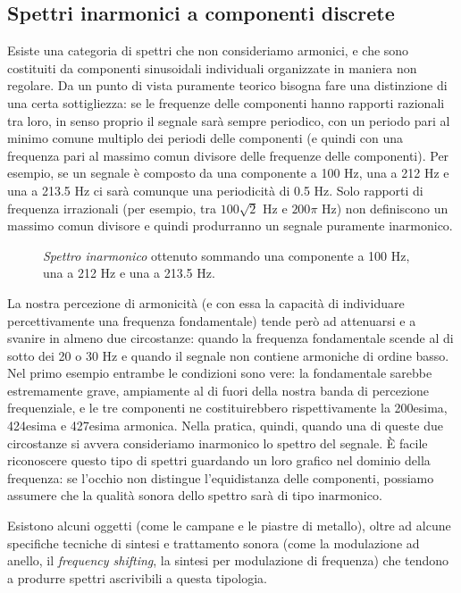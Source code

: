 \subsection{Spettri inarmonici a componenti discrete}

Esiste una categoria di spettri che non consideriamo armonici, e che sono costituiti da componenti sinusoidali individuali organizzate in maniera non regolare. Da un punto di vista puramente teorico bisogna fare una distinzione di una certa sottigliezza: se le frequenze delle componenti hanno rapporti razionali tra loro, in senso proprio il segnale sarà sempre periodico, con un periodo pari al minimo comune multiplo dei periodi delle componenti (e quindi con una frequenza pari al massimo comun divisore delle frequenze delle componenti). Per esempio, se un segnale è composto da una componente a 100 Hz, una a 212 Hz e una a 213.5 Hz ci sarà comunque una periodicità di 0.5 Hz. Solo rapporti di frequenza irrazionali (per esempio, tra $100 \sqrt{2}$ Hz e $200 \pi$ Hz) non definiscono un massimo comun divisore e quindi produrranno un segnale puramente inarmonico.

\begin{figure}
    \begin{center}
       \scalebox{0.6} {}
    \end{center}
    \caption{\emph{Spettro inarmonico} ottenuto sommando una componente a 100 Hz, una a 212 Hz e una a 213.5 Hz.}
\end{figure}


La nostra percezione di armonicità (e con essa la capacità di individuare percettivamente una frequenza fondamentale) tende però ad attenuarsi e a svanire in almeno due circostanze: quando la frequenza fondamentale scende al di sotto dei 20 o 30 Hz e quando il segnale non contiene armoniche di ordine basso. Nel primo esempio entrambe le condizioni sono vere: la fondamentale sarebbe estremamente grave, ampiamente al di fuori della nostra banda di percezione frequenziale, e le tre componenti ne costituirebbero rispettivamente la 200esima, 424esima e 427esima armonica. Nella pratica, quindi, quando una di queste due circostanze si avvera consideriamo inarmonico lo spettro del segnale. È facile riconoscere questo tipo di spettri guardando un loro grafico nel dominio della frequenza: se l'occhio non distingue l'equidistanza delle componenti, possiamo assumere che la qualità sonora dello spettro sarà di tipo inarmonico.

Esistono alcuni oggetti (come le campane e le piastre di metallo), oltre ad alcune specifiche tecniche di sintesi e trattamento sonora (come la modulazione ad anello, il \emph{frequency shifting}, la sintesi per modulazione di frequenza) che tendono a produrre spettri ascrivibili a questa tipologia.





